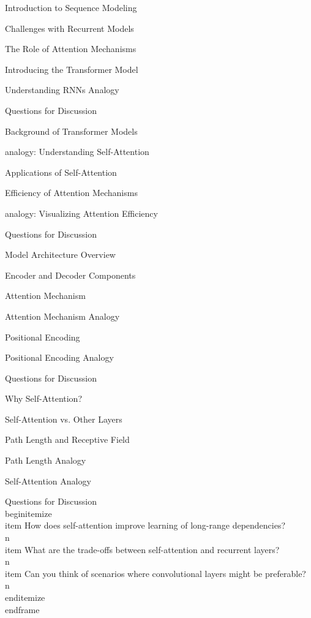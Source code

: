 \documentclass{beamer}
\begin{document}
\begin{frame}[]{Introduction to Sequence Modeling}
\begin{frame}[]{Challenges with Recurrent Models}
\begin{frame}[]{The Role of Attention Mechanisms}
\begin{frame}[]{Introducing the Transformer Model}
\begin{frame}[plain]{Understanding RNNs Analogy}
\begin{frame}[]{Questions for Discussion}
\begin{frame}[]{Background of Transformer Models}
\begin{frame}[plain]{analogy: Understanding Self-Attention}
\begin{frame}[]{Applications of Self-Attention}
\begin{frame}[]{Efficiency of Attention Mechanisms}
\begin{frame}[plain]{analogy: Visualizing Attention Efficiency}
\begin{frame}[]{Questions for Discussion}
\begin{frame}[]{Model Architecture Overview}
\begin{frame}[]{Encoder and Decoder Components}
\begin{frame}[]{Attention Mechanism}
\begin{frame}[plain]{Attention Mechanism Analogy}
\begin{frame}[]{Positional Encoding}
\begin{frame}[plain]{Positional Encoding Analogy}
\begin{frame}[]{Questions for Discussion}
\begin{frame}[]{Why Self-Attention?}
\begin{frame}[]{Self-Attention vs. Other Layers}
\begin{frame}[]{Path Length and Receptive Field}
\begin{frame}[plain]{Path Length Analogy}
\begin{frame}[plain]{Self-Attention Analogy}
\begingroup
{}\n{}\n\begin{frame}[]{Questions for Discussion}\n\\begin{itemize}
\\item How does self-attention improve learning of long-range dependencies?\\n\\item What are the trade-offs between self-attention and recurrent layers?\\n\\item Can you think of scenarios where convolutional layers might be preferable?\\n\\end{itemize}
\\end{frame}

\endgroup


\end{frame}
\end{frame}
\end{frame}
\end{frame}
\end{frame}
\end{frame}
\end{frame}
\end{frame}
\end{frame}
\end{frame}
\end{frame}
\end{frame}
\end{frame}
\end{frame}
\end{frame}
\end{frame}
\end{frame}
\end{frame}
\end{frame}
\end{frame}
\end{frame}
\end{frame}
\end{frame}
\end{frame}
\end{frame}
\end{document}
